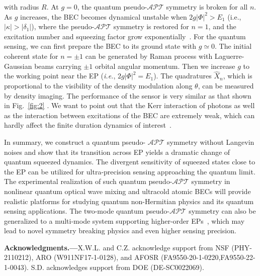 \documentclass[twocolumn,prl,floatfix,citeautoscript,nofootinbib,superscriptaddress]{revtex4}
\begin{document}
with radius $R$. At $g=0$, the quantum pseudo-$\mathcal{APT}$ symmetry is
broken for all $n$. As $g$ increases, the BEC becomes dynamical unstable
when $2g|\Phi |^{2}>E_{1}$ (i.e., $|\kappa |>|\delta _{1}|$), where the
pseudo-$\mathcal{APT}$ symmetry is restored for $n=1$, and the excitation
number and squeezing factor grow exponentially~\cite%
{PhysRevA.65.033605,PhysRevA.68.043625}. For the quantum
sensing, we can first prepare the BEC to its ground state with $g\simeq 0$.
The initial coherent state for $n=\pm 1$ can be generated by Raman process
with Laguerre-Gaussian beams carrying $\pm 1$ orbital angular momentum. Then
we increase $g$ to the working point near the EP (\textit{i.e.}, $2g|\Phi
|^{2}=E_{1}$). The quadratures $\hat{X}_{n}$, which is proportional to the
visibility of the density modulation along $\theta $, can be measured by
density imaging. The performance of the sensor is very similar as that shown
in Fig.~\ref{fig:2} \cite{SM}. We want to point out that the Kerr interaction of photons as well as the
interaction between excitations of the BEC are extremely weak,
which can hardly affect the finite duration dynamics of interest~\cite{SM}.

\emph{\color{blue}{Conclusion.---}}In summary, we construct a quantum pseudo-%
$\mathcal{APT}$ symmetry without Langevin noises and show that its
transition across EP yields a dramatic change of quantum squeezed dynamics.
The divergent sensitivity of squeezed states close to the EP can be utilized
for ultra-precision sensing approaching the quantum limit. The experimental
realization of such quantum pseudo-$\mathcal{APT}$ symmetry in nonlinear
quantum optical wave mixing and ultracold atomic BECs will provide realistic
platforms for studying quantum non-Hermitian physics and its quantum sensing
applications. The two-mode quantum pseudo-$\mathcal{APT}$ symmetry can also
be generalized to a multi-mode system supporting higher-order EPs~\cite%
{nature23280,s41467-019-08826-6}, which may lead to novel symmetry breaking
physics and even higher sensing precision.

\begin{acknowledgments}
\textbf{Acknowledgments.---}X.W.L. and C.Z. acknowledge support from NSF
(PHY-2110212), ARO (W911NF17-1-0128), and AFOSR
(FA9550-20-1-0220,FA9550-22-1-0043). S.D. acknowledges support from DOE
(DE-SC0022069).
\end{acknowledgments}
\end{document}
